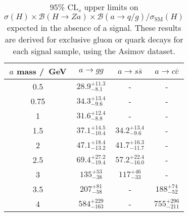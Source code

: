 \documentclass[NOTE, atlasdraft=true, texlive=2017, UKenglish]{\ATLASLATEXPATH atlasdoc}
\begin{document}
\begin{table}[!htbp]{\footnotesize\renewcommand{\arraystretch}{1.2} %
  \begin{center}
    \footnotesize
    \begin{tabular}{|c|ccc|}
      \hline
      $a$ mass /~GeV & $a\to gg$ & $a\to s\bar s$ & $a\to c\bar c$ \\
      \hline
      0.5 & $28.9^{+11.3}_{-8.1}$ & - & - \\
      0.75 & $34.3^{+13.4}_{-9.6}$ & - & - \\
      1 & $31.6^{+12.4}_{-8.8}$ & - & - \\
      1.5 & $37.1^{+14.5}_{-10.4}$ & $34.2^{+13.4}_{-9.6}$ & - \\
      2 & $47.1^{+18.4}_{-13.2}$ & $41.7^{+16.3}_{-11.7}$ & - \\
      2.5 & $69.4^{+27.2}_{-19.4}$ & $57.2^{+22.4}_{-16.0}$ & - \\
      3 & $135^{+53}_{-38}$ & $117^{+46}_{-33}$ & - \\
      3.5 & $207^{+81}_{-58}$ & - & $188^{+74}_{-52}$ \\
      4 & $584^{+229}_{-163}$ & - & $755^{+296}_{-211}$ \\
      \hline
    \end{tabular}
    \caption{95\% $\text{CL}_s$ upper limits on $\sigma(H)\times\mathcal{B}(H\to Za)\times\mathcal{B}(a\to q/g)/\sigma_\text{SM}(H)$ expected in the absence of a signal. These results are derived for exclusive gluon or quark decays for each signal sample, using the Asimov dataset.}
    \label{tab:modelindependentlimits}
  \end{center}}
\end{table}

\end{document}
